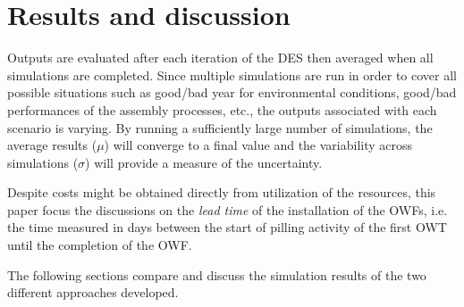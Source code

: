 \section{Results and discussion}
\label{results}
Outputs are evaluated after each iteration of the DES then averaged when all simulations are completed. Since multiple simulations are run in order to cover all possible situations such as good/bad year for environmental conditions, good/bad performances of the assembly processes, etc., the outputs associated with each scenario is varying. By running a sufficiently large number of simulations, the average results ($\mu$) will converge to a final value and the variability across simulations ($\sigma$) will provide a measure of the uncertainty.

Despite costs might be obtained directly from utilization of the resources, this paper focus the discussions on the \textit{lead time} of the installation of the OWFs, i.e. the time measured in days between the start of pilling activity of the first OWT until the completion of the OWF.


The following sections compare and discuss the simulation results of the two different approaches developed.